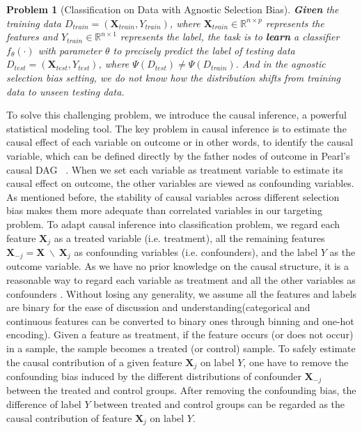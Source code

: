\documentclass[sigconf]{acmart}
\newtheorem{problem}{Problem}
\begin{document}
\begin{problem}[Classification on Data with Agnostic Selection Bias]
\textbf{Given} the training data $D_{train}=(\bm{X}_{train},Y_{train})$, where $\bm{X}_{train} \in \mathbb{R}^{n\times p}$ represents the features and $Y_{train} \in \mathbb{R}^{n\times 1}$ represents the label, the task is to \textbf{learn} a classifier $f_{\theta}(\cdot)$ with parameter $\theta$ to precisely predict the label of testing data $D_{test} = (\bm{X}_{test}, Y_{test})$, where $\Psi(D_{test})\neq \Psi(D_{train})$. And in the agnostic selection bias setting, we do not know how the distribution shifts from training data to unseen testing data.
\end{problem}

To solve this challenging problem, we introduce the causal inference, a powerful statistical modeling tool.
The key problem in causal inference is to estimate the causal effect of each variable on outcome or in other words, to identify the causal variable, which can be defined directly by the father nodes of outcome in Pearl's causal DAG ~\cite{Pearl2000Causality}.
When we set each variable as treatment variable to estimate its causal effect on outcome, the other variables are viewed as confounding variables.
As mentioned before, the stability of causal variables across different selection bias makes them more adequate than correlated variables in our targeting problem.
To adapt causal inference into classification problem, we regard each feature $\bm{X}_j$ as a treated variable (i.e. treatment), all the remaining features $\bm{X}_{-j} = \bm{X} \ \backslash \  \bm{X}_j$ as confounding variables (i.e. confounders), and the label $Y$ as the outcome variable.
As we have no prior knowledge on the causal structure, it is a reasonable way to regard each variable as treatment and all the other variables as confounders \cite{hainmueller2011entropy}.
Without losing any generality, we assume all the features and labels are binary for the ease of discussion and understanding(categorical and continuous features can be converted to binary ones through binning and one-hot encoding).
Given a feature as treatment, if the feature occurs (or does not occur) in a sample, the sample becomes a treated (or control) sample.
To safely estimate the causal contribution of a given feature $\bm{X}_j$ on label $Y$, one have to remove the confounding bias induced by the different distributions of confounder $\bm{X}_{-j}$ between the treated and control groups.
After removing the confounding bias, the difference of label $Y$ between treated and control groups can be regarded as the causal contribution of feature $\bm{X}_j$ on label $Y$.
\end{document}
